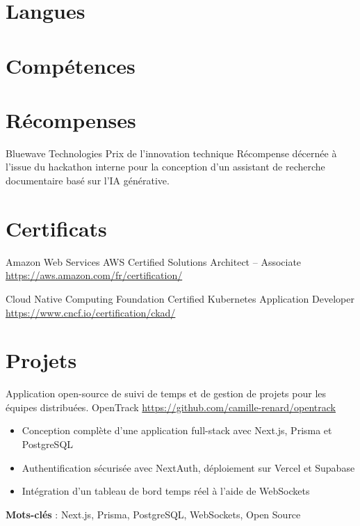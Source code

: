 \documentclass[a4paper, serif, 10pt]{moderncv}
\begin{document}
\section{Langues}

\section{Compétences}

\section{Récompenses}

        {Bluewave Technologies}
        {Prix de l’innovation technique}
        {}
        {}
        {Récompense décernée à l’issue du hackathon interne pour la conception d’un assistant de recherche documentaire basé sur l’IA générative.}
\section{Certificats}

        {Amazon Web Services}
        {AWS Certified Solutions Architect – Associate}
        {\url{https://aws.amazon.com/fr/certification/}}
        {}
        {}

        {Cloud Native Computing Foundation}
        {Certified Kubernetes Application Developer}
        {\url{https://www.cncf.io/certification/ckad/}}
        {}
        {}
\section{Projets}

        {Application open-source de suivi de temps et de gestion de projets pour les équipes distribuées.}
        {OpenTrack}
        {\url{https://github.com/camille-renard/opentrack}}
        {}
        {\begin{itemize}
\item Conception complète d’une application full-stack avec Next.js, Prisma et PostgreSQL
\item Authentification sécurisée avec NextAuth, déploiement sur Vercel et Supabase
\item Intégration d’un tableau de bord temps réel à l’aide de WebSockets
\end{itemize}
\textbf{Mots-clés} : Next.js, Prisma, PostgreSQL, WebSockets, Open Source}
\end{document}

